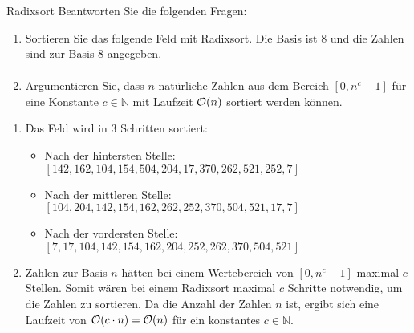 \documentclass{article}
\begin{document}
\begin{exercise}{Radixsort}
  Beantworten Sie die folgenden Fragen:
  \begin{enumerate}
    \item Sortieren Sie das folgende Feld mit Radixsort. Die Basis ist 8 und die Zahlen sind zur Basis 8 angegeben.
          \begin{align*}
            [142, 204, 154, 7, 104, 162, 521, 17, 262, 504, 370, 252]
          \end{align*}
    \item Argumentieren Sie, dass $n$ natürliche Zahlen aus dem Bereich $[0, n^c - 1]$ für eine Konstante $c \in \mathbb{N}$ mit Laufzeit $\mathcal{O}(n)$ sortiert werden können.
  \end{enumerate}

  \begin{solution}
    \begin{enumerate}
      \item Das Feld wird in 3 Schritten sortiert:
            \begin{itemize}
              \item Nach der hintersten Stelle: $[142, 162, 104, 154, 504, 204, 17, 370, 262, 521, 252, 7]$
              \item Nach der mittleren Stelle: $[104, 204, 142, 154, 162, 262, 252, 370, 504, 521, 17, 7]$
              \item Nach der vordersten Stelle: $[7, 17, 104, 142, 154, 162, 204, 252, 262, 370, 504, 521]$
            \end{itemize}
      \item Zahlen zur Basis $n$ hätten bei einem Wertebereich von $[0,n^c-1]$ maximal $c$ Stellen. Somit wären bei einem Radixsort maximal $c$ Schritte notwendig, um die Zahlen zu sortieren. Da die Anzahl der Zahlen $n$ ist, ergibt sich eine Laufzeit von $\mathcal{O}(c\cdot n)=\mathcal{O}(n)$ für ein konstantes $c\in \mathbb{N}$.
    \end{enumerate}
  \end{solution}
\end{exercise}
\end{document}

